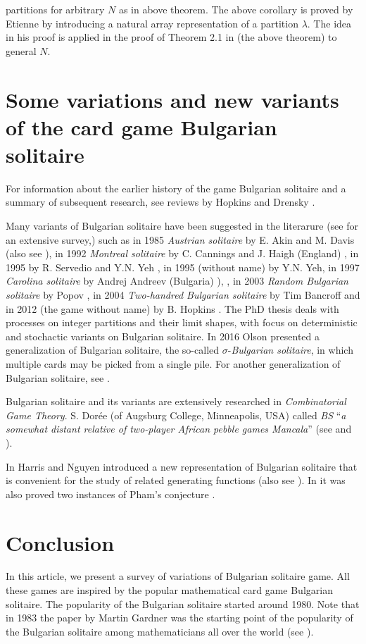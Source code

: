 \documentclass[oneside,12pt]{amsart}
\theoremstyle{definition}
\numberwithin{equation}{section}
\begin{document}
partitions for
 arbitrary $N$ as in above theorem.  The above corollary is proved
 by Etienne \cite{et} by introducing a natural array representation
 of a partition $\lambda$. The idea in his proof is applied
 in the proof of Theorem 2.1 in \cite{gh} 
(the above theorem) to general  $N$.


\section{Some variations and new variants of the card game Bulgarian solitaire}
For information about the earlier history of the game Bulgarian solitaire 
and a summary of subsequent research, see reviews by Hopkins \cite{ho}
and Drensky \cite{dr}.

Many variants of Bulgarian solitaire have been suggested in the literarure 
(see \cite{dr} for an extensive survey,) such as in 1985 
{\it Austrian solitaire} by E. Akin and M. Davis
 \cite{ad} (also see \cite{bas}), in  1992 {\it Montreal solitaire} 
by C. Cannings and J. Haigh (England) \cite{ch}, in 1995  
by R. Servedio and Y.N. Yeh \cite{sy}, in 1995 (without name) by Y.N. Yeh,
in 1997 {\it Carolina solitaire} by Andrej Andreev 
(Bulgaria) \cite{man}), \cite{ch}, in 2003 {\it Random Bulgarian solitaire}
by  Popov  \cite{po}, in 2004 
{\it Two-handred Bulgarian solitaire} by Tim  Bancroff  \cite{man}
and in 2012 (the game without name) by B. Hopkins  \cite{jo}.
The PhD thesis \cite{jo} deals with processes on integer partitions and their 
limit shapes, with focus on deterministic and stochactic variants on Bulgarian 
solitaire.  In 2016 Olson \cite{ol} presented a generalization 
of Bulgarian solitaire, the so-called $\sigma$-{\it Bulgarian solitaire},
in which multiple cards may be picked from a single pile.
For another generalization of Bulgarian solitaire, see \cite{ejs}.    
 


Bulgarian solitaire and its variants are extensively researched in 
{\it Combinatorial Game Theory}. S. Dor\'{e}e (of Augsburg College, 
Minneapolis, USA) called {\it BS} ``{\it a somewhat distant 
relative of two-player African pebble games Mancala}'' (see \cite{man}
and \cite{d}). 


In \cite{hn} Harris and Nguyen introduced a new representation of Bulgarian 
solitaire that is convenient for the study of related generating functions
(also see \cite{ej}).
In \cite{hn} it was also  proved two instances 
of Pham's conjecture \cite{ph}.

\section{Conclusion}
In this   article,  we present a survey of variations 
of  Bulgarian solitaire game. All these games are inspired by the 
popular mathematical card game Bulgarian solitaire. 
The popularity of the Bulgarian solitaire started  around 1980. 
Note that  in 1983 the paper 
\cite{ga} by Martin Gardner was the starting point 
of the popularity of the Bulgarian solitaire among mathematicians 
all over the world (see \cite{dr}).    
\end{document}
